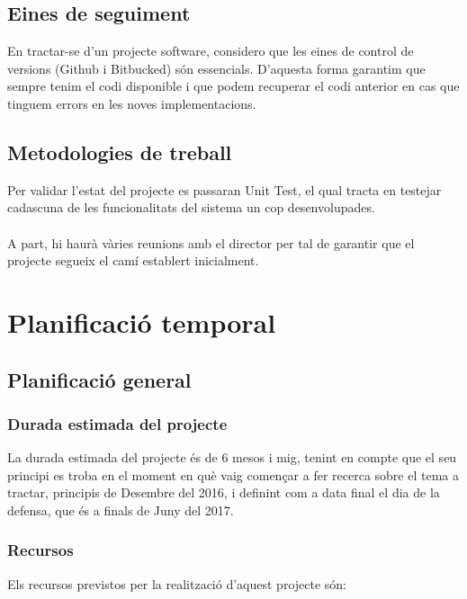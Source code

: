 \documentclass[11pt,catalan,listoffigures,listoftables]{tfgetsinf}
\begin{document}
\subsection{Eines de seguiment} 

En tractar-se d’un projecte software, considero que les eines de control de versions (Github i Bitbucked) són essencials. D’aquesta forma garantim que sempre tenim el codi disponible i que podem recuperar el codi anterior en cas que tinguem errors en les noves implementacions.


\subsection{Metodologies de treball} 

Per validar l’estat del projecte es passaran Unit Test, el qual tracta en testejar cadascuna de les funcionalitats del sistema un cop desenvolupades.\\ \\
A part, hi haurà vàries reunions amb el director per tal de garantir que el projecte segueix el camí establert inicialment.

\section{Planificació temporal}

\subsection{Planificació general}

\subsubsection{Durada estimada del projecte}

La durada estimada del projecte és de 6 mesos i mig, tenint en compte que el seu principi es troba en el moment en què vaig començar a fer recerca sobre el tema a tractar, principis de Desembre del 2016, i definint com a data final el dia de la defensa, que és a finals de Juny del 2017.

\subsubsection{Recursos}

Els recursos previstos per la realització d’aquest projecte són:
\end{document}
